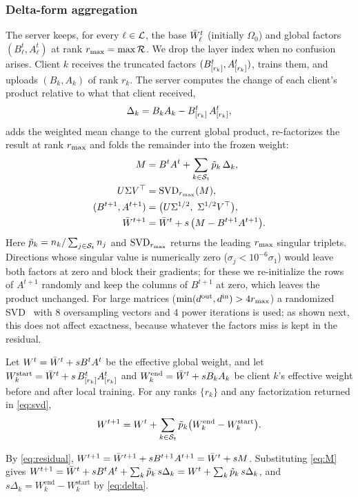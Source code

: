 \subsubsection{Delta-form aggregation}
The server keeps, for every $\ell\in\mathcal{L}$, the base $\bar{W}^t_\ell$ (initially $\Omega_0$) and
global factors $(B^t_\ell,A^t_\ell)$ at rank $r_{\max}=\max\mathcal{R}$. We drop the layer index
when no confusion arises. Client $k$ receives the truncated factors
$(B^t_{[r_k]},A^t_{[r_k]})$, trains them, and uploads $(B_k,A_k)$ of rank $r_k$. The server
computes the change of each client's product relative to what that client received,
\begin{equation}\label{eq:delta}
  \Delta_k=B_kA_k-B^t_{[r_k]}\,A^t_{[r_k]},
\end{equation}
adds the weighted mean change to the current global product, re-factorizes the result at rank
$r_{\max}$ and folds the remainder into the frozen weight:
\begin{align}
  M&=B^tA^t+\sum_{k\in\mathcal{S}_t}\tilde{p}_k\,\Delta_k, \label{eq:M}\\
  U\Sigma V^{\top}&=\mathrm{SVD}_{r_{\max}}(M), \nonumber\\
  (B^{t+1},A^{t+1})&=\big(U\Sigma^{1/2},\ \Sigma^{1/2}V^{\top}\big), \label{eq:svd}\\
  \bar{W}^{t+1}&=\bar{W}^{t}+s\,\big(M-B^{t+1}A^{t+1}\big). \label{eq:residual}
\end{align}
Here $\tilde{p}_k=n_k/\sum_{j\in\mathcal{S}_t}n_j$ and $\mathrm{SVD}_{r_{\max}}$ returns the leading $r_{\max}$ singular
triplets. Directions whose singular value is numerically zero ($\sigma_j<10^{-6}\sigma_1$) would
leave both factors at zero and block their gradients; for these we re-initialize the rows of
$A^{t+1}$ randomly and keep the columns of $B^{t+1}$ at zero, which leaves the product
unchanged. For large matrices ($\min(d^{\mathrm{out}},d^{\mathrm{in}})>4r_{\max}$) a randomized
SVD~\cite{halko2011finding} with $8$ oversampling vectors and $4$ power iterations is used; as shown
next, this does not affect exactness, because whatever the factors miss is kept in the residual.

\begin{proposition}[Exactness]\label{prop:exact}
Let $W^t=\bar{W}^t+sB^tA^t$ be the effective global weight, and let
$W_k^{\mathrm{start}}=\bar{W}^t+s\,B^t_{[r_k]}A^t_{[r_k]}$ and
$W_k^{\mathrm{end}}=\bar{W}^t+sB_kA_k$ be client $k$'s effective weight before and after local training.
For any ranks $\{r_k\}$ and any factorization returned in \cref{eq:svd},
\begin{equation}\label{eq:exact}
  W^{t+1}=W^t+\sum_{k\in\mathcal{S}_t}\tilde{p}_k\big(W_k^{\mathrm{end}}-W_k^{\mathrm{start}}\big).
\end{equation}
\end{proposition}
\begin{IEEEproof}
By \cref{eq:residual}, $W^{t+1}=\bar{W}^{t+1}+sB^{t+1}A^{t+1}=\bar{W}^t+sM$. Substituting \cref{eq:M}
gives $W^{t+1}=\bar{W}^t+sB^tA^t+\sum_k\tilde{p}_k\,s\Delta_k=W^t+\sum_k\tilde{p}_k\,s\Delta_k$, and
$s\Delta_k=W_k^{\mathrm{end}}-W_k^{\mathrm{start}}$ by \cref{eq:delta}.
\end{IEEEproof}

